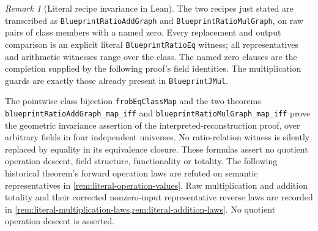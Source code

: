 \documentclass[11pt,oneside]{article}
\theoremstyle{definition}
\theoremstyle{remark}
\newtheorem{remark}[theorem]{Remark}
\newcommand{\lean}[1]{\nolinkurl{#1}}
\begin{document}
\begin{remark}[Literal recipe invariance in Lean]\label{rem:literal-recipe-invariance}
The two recipes just stated are transcribed as \lean{BlueprintRatioAddGraph} and
\lean{BlueprintRatioMulGraph}, on raw pairs of class members with a named zero. Every
replacement and output comparison is an explicit literal \lean{BlueprintRatioEq}
witness; all representatives and arithmetic witnesses range over the class. The named
zero clauses are the completion supplied by the following proof's field identities.
The multiplication guards are exactly those already present in \lean{BlueprintJMul}.

The pointwise class bijection \lean{frobEqClassMap} and the two theorems
\lean{blueprintRatioAddGraph_map_iff} and \lean{blueprintRatioMulGraph_map_iff}
prove the geometric invariance assertion of the interpreted-reconstruction proof,
over arbitrary fields in four independent universes. No ratio-relation witness is
silently replaced by equality in its equivalence closure. These formulas assert no
quotient operation descent, field structure, functionality or totality. The following
historical theorem's forward operation laws are refuted on semantic representatives in
\cref{rem:literal-operation-values}. Raw multiplication and addition totality and
their corrected nonzero-input representative reverse laws are recorded in
\cref{rem:literal-multiplication-laws,rem:literal-addition-laws}. No quotient
operation descent is asserted.
\end{remark}
\end{document}
